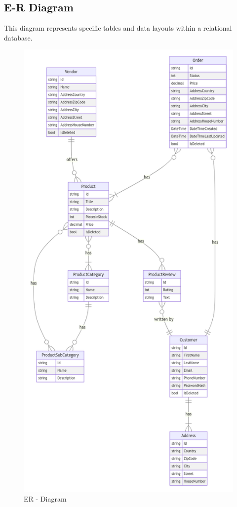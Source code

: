 \documentclass[12pt,english]{article}
\begin{document}
\newpage
\subsection{E-R Diagram}
This diagram represents specific tables and data layouts within a relational database.
\begin{figure}[hp]
    \centering
    \includegraphics[scale=.45]{images/erd.png}
    \caption{ER - Diagram}
    \label{fig:my_label}
\end{figure}
\end{document}
